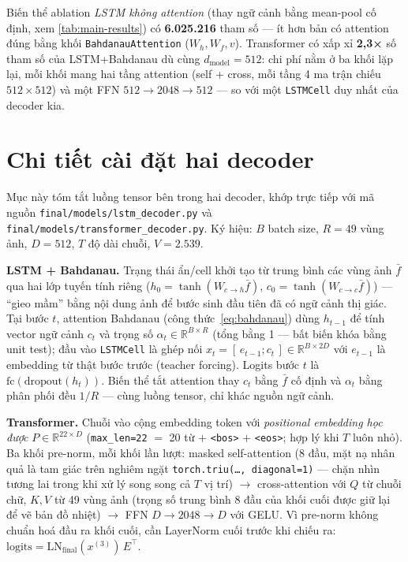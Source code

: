 Biến thể ablation \emph{LSTM không attention} (thay ngữ cảnh bằng mean-pool cố
định, xem \ref{tab:main-results}) có \textbf{6.025.216} tham số --- ít hơn bản
có attention đúng bằng khối \texttt{BahdanauAttention} ($W_h, W_f, v$).
Transformer có xấp xỉ \textbf{2,3×} số tham số của LSTM+Bahdanau dù cùng
$d_{\text{model}}=512$: chi phí nằm ở ba khối lặp lại, mỗi khối mang hai tầng
attention (self + cross, mỗi tầng 4 ma trận chiếu $512\times512$) và một FFN
$512\to2048\to512$ --- so với một \texttt{LSTMCell} duy nhất của decoder kia.

\section{Chi tiết cài đặt hai decoder}
\label{sec:decoder-detail}

Mục này tóm tắt luồng tensor bên trong hai decoder, khớp trực tiếp với mã nguồn
\texttt{final/models/lstm\_decoder.py} và
\texttt{final/models/transformer\_decoder.py}. Ký hiệu: $B$ batch size, $R=49$
vùng ảnh, $D=512$, $T$ độ dài chuỗi, $V=2.539$.

\textbf{LSTM + Bahdanau.} Trạng thái ẩn/cell khởi tạo từ trung bình các vùng
ảnh $\bar f$ qua hai lớp tuyến tính riêng ($h_0 = \tanh(W_{c\to h}\bar f)$,
$c_0 = \tanh(W_{c\to c}\bar f)$) --- ``gieo mầm'' bằng nội dung ảnh để bước
sinh đầu tiên đã có ngữ cảnh thị giác. Tại bước $t$, attention Bahdanau
(công thức~\ref{eq:bahdanau}) dùng $h_{t-1}$ để tính vector ngữ cảnh $c_t$ và
trọng số $\alpha_t \in \mathbb{R}^{B\times R}$ (tổng bằng 1 --- bất biến khóa
bằng unit test); đầu vào \texttt{LSTMCell} là ghép nối
$x_t = [\,e_{t-1}; c_t\,] \in \mathbb{R}^{B\times 2D}$ với $e_{t-1}$ là
embedding từ thật bước trước (teacher forcing). Logits bước $t$ là
$\text{fc}(\text{dropout}(h_t))$. Biến thể tắt attention thay $c_t$ bằng
$\bar f$ cố định và $\alpha_t$ bằng phân phối đều $1/R$ --- cùng luồng tensor,
chỉ khác nguồn ngữ cảnh.

\textbf{Transformer.} Chuỗi vào cộng embedding token với \emph{positional
embedding học được} $P \in \mathbb{R}^{22\times D}$ (\texttt{max\_len=22} $=$
20 từ $+$ \texttt{<bos>} $+$ \texttt{<eos>}; hợp lý khi $T$ luôn nhỏ). Ba khối
pre-norm, mỗi khối lần lượt: masked self-attention (8 đầu, mặt nạ nhân quả là
tam giác trên nghiêm ngặt \texttt{torch.triu(\dots, diagonal=1)} --- chặn nhìn
tương lai trong khi xử lý song song cả $T$ vị trí) $\to$ cross-attention với
$Q$ từ chuỗi chữ, $K,V$ từ 49 vùng ảnh (trọng số trung bình 8 đầu của khối cuối
được giữ lại để vẽ bản đồ nhiệt) $\to$ FFN $D \to 2048 \to D$ với GELU. Vì
pre-norm không chuẩn hoá đầu ra khối cuối, cần LayerNorm cuối trước khi chiếu
ra: $\text{logits} = \text{LN}_{\text{final}}(x^{(3)})\, E^\top$.

